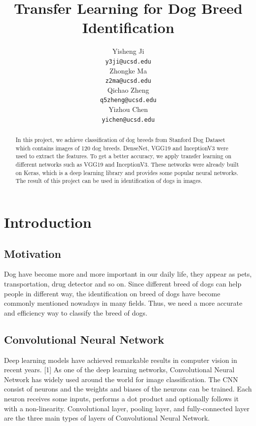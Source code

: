 \documentclass{article}
\title{Transfer Learning for Dog Breed Identification}
\author{%
   Yisheng Ji\\
  \texttt{y3ji@ucsd.edu} \\
  \And
  Zhongke Ma\\
  \texttt{z2ma@ucsd.edu} \\
  \And
  Qichao Zheng\\
  \texttt{q5zheng@ucsd.edu} \\
  \And
  Yizhou Chen\\
  \texttt{yichen@ucsd.edu} 
}
\begin{document}

\maketitle

\begin{abstract}
  In this project, we achieve classification of dog breeds from Stanford Dog Dataset which contains images of 120 dog breeds. DenseNet, VGG19 and InceptionV3 were used to extract the features. To get a better accuracy, we apply transfer learning on different networks such as VGG19 and InceptionV3. These networks were already built on Keras, which is a deep learning library and provides some popular neural networks. The result of this project can be used in identification of dogs in images.
\end{abstract}

\section{Introduction}

\subsection{Motivation}

Dog have become more and more important in our daily life, they appear as pets, transportation, drug detector and so on. Since different breed of dogs can help people in different way, the identification on breed of dogs have become commonly mentioned nowadays in many fields. Thus, we need a more accurate and efficiency way to classify the breed of dogs.


\subsection{Convolutional Neural Network}

Deep learning models have achieved remarkable results in computer vision in recent years. [1] As one of the deep learning networks, Convolutional Neural Network has widely used around the world for image classification. The CNN consist of neurons and the weights and biases of the neurons can be trained. Each neuron receives some inputs, performs a dot product and optionally follows it with a non-linearity. Convolutional layer, pooling layer, and fully-connected layer are the three main types of layers of Convolutional Neural Network.
\end{document}
